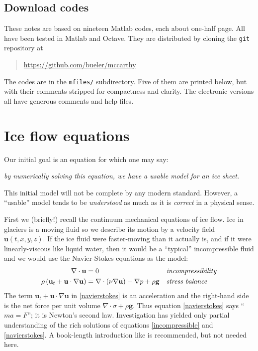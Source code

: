 \documentclass[letterpaper,final,12pt,reqno]{amsart}
\begin{document}
\subsection*{Download codes}  These notes are based on nineteen Matlab codes, each about one-half page.  All have been tested in Matlab and Octave.  They are distributed by cloning the \texttt{git} repository at
\begin{quote}
\url{https://github.com/bueler/mccarthy}
\end{quote}
\noindent The codes are in the \texttt{mfiles/} subdirectory.  Five of them are printed below, but with their comments stripped for compactness and clarity.  The electronic versions all have generous comments and help files.


\section{Ice flow equations}  \label{sec:continuum}

Our initial goal is an equation for which one may say:
\begin{center}
\emph{by numerically solving this equation, we have a usable model for an ice sheet.}
\end{center}
\noindent This initial model will not be complete by any modern standard.  However, a ``usable'' model tends to be \emph{understood} as much as it is \emph{correct} in a physical sense.

First we (briefly!) recall the continuum mechanical equations of ice flow.  Ice in glaciers is a moving fluid so we describe its motion by a velocity field $\mathbf{u}(t,x,y,z)$.  If the ice fluid were faster-moving than it actually is, and if it were linearly-viscous like liquid water, then it would be a ``typical'' incompressible fluid and we would use the Navier-Stokes equations as the model:
\begin{align}
\nabla \cdot \mathbf{u} &= 0 &&\text{\emph{incompressibility}} \label{incompressible} \\
\rho \left(\mathbf{u}_t + \mathbf{u}\cdot\nabla \mathbf{u}\right) &= \nabla \cdot (\nu \nabla \mathbf{u}) - \nabla p + \rho \mathbf{g} &&\text{\emph{stress balance}} \label{navierstokes}
\end{align}
The term $\mathbf{u}_t + \mathbf{u}\cdot\nabla \mathbf{u}$ in \eqref{navierstokes} is an acceleration and the right-hand side is the net force per unit volume $\nabla \cdot \sigma + \rho \mathbf{g}$.  Thus equation \eqref{navierstokes} says ``$ma=F$''; it is Newton's second law.  Investigation has yielded only partial understanding of the rich solutions of equations \eqref{incompressible} and \eqref{navierstokes}.  A book-length introduction like \cite{Acheson} is recommended, but not needed here.
\end{document}
